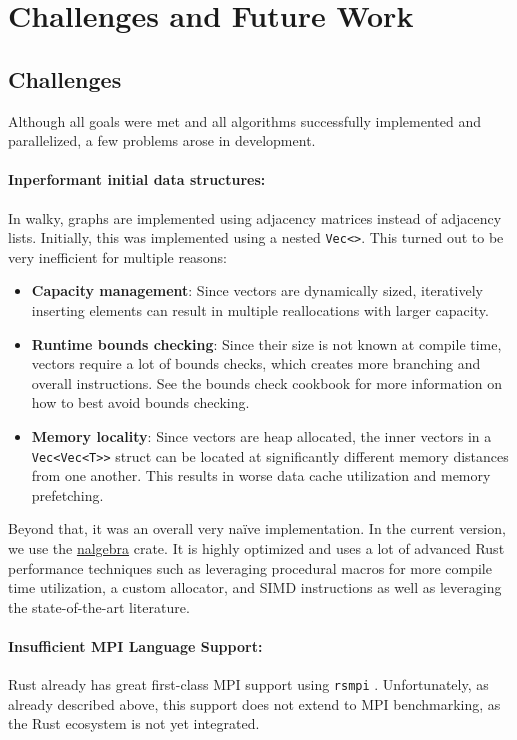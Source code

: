 \section{Challenges and Future Work}

\subsection{Challenges}
Although all goals were met and all algorithms successfully implemented and parallelized, a few problems arose in development.

\paragraph{Inperformant initial data structures:}
In walky, graphs are implemented using adjacency matrices instead of adjacency lists. Initially, this was implemented using a nested \texttt{Vec<>}. This turned out to be very inefficient for multiple reasons:
\begin{itemize}
\item \textbf{Capacity management}: Since vectors are dynamically sized, iteratively inserting elements can result in multiple reallocations with larger capacity.
\item \textbf{Runtime bounds checking}: Since their size is not known at compile time, vectors require a lot of bounds checks, which creates more branching and overall instructions. See the bounds check cookbook \cite{davidoff_recipes_2023} for more information on how to best avoid bounds checking.
\item \textbf{Memory locality}: Since vectors are heap allocated, the inner vectors in a \texttt{Vec<Vec<T>>} struct can be located at significantly different memory distances from one another. This results in worse data cache utilization and memory prefetching.
\end{itemize}
Beyond that, it was an overall very na\"ive implementation. In the current version, we use the \href{https://github.com/dimforge/nalgebra}{nalgebra} crate. It is highly optimized and uses a lot of advanced Rust performance techniques such as leveraging procedural macros for more compile time utilization, a custom allocator, and SIMD instructions as well as leveraging the state-of-the-art literature.

\paragraph{Insufficient \ac{MPI} Language Support:}
Rust already has great first-class \ac{MPI} support using \texttt{rsmpi} \cite{noauthor_mpi_2023}. Unfortunately, as already described above, this support does not extend to \ac{MPI} benchmarking, as the Rust ecosystem is not yet integrated.

